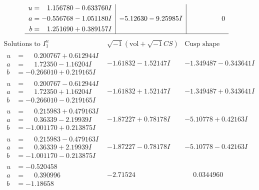 \documentclass[1p]{elsarticle_modified}
\theoremstyle{definition}
\newcommand{\I}{\sqrt{-1}}
\begin{document}
$$\begin{array}{c|c|c}
\begin{aligned}
u &= \phantom{-}1.156780 - 0.633760 I \\
a &= -0.556768 - 1.051180 I \\
b &= \phantom{-}1.251690 + 0.389157 I\end{aligned}
 & -5.12630 - 9.25985 I & \phantom{-0.000000 } 0\\
 \hline 
 \end{array}$$\newpage$$\begin{array}{c|c|c}  
\text{Solutions to }I^u_{1}& \I (\text{vol} + \sqrt{-1}CS) & \text{Cusp shape}\\
 \hline 
\begin{aligned}
u &= \phantom{-}0.200767 + 0.612944 I \\
a &= \phantom{-}1.72350 - 1.16204 I \\
b &= -0.266010 + 0.219165 I\end{aligned}
 & -1.61832 - 1.52147 I & -1.349487 - 0.343641 I \\ \hline\begin{aligned}
u &= \phantom{-}0.200767 - 0.612944 I \\
a &= \phantom{-}1.72350 + 1.16204 I \\
b &= -0.266010 - 0.219165 I\end{aligned}
 & -1.61832 + 1.52147 I & -1.349487 + 0.343641 I \\ \hline\begin{aligned}
u &= \phantom{-}0.215983 + 0.479163 I \\
a &= \phantom{-}0.36339 - 2.19939 I \\
b &= -1.001170 + 0.213875 I\end{aligned}
 & -1.87227 + 0.78178 I & -5.10778 + 0.42163 I \\ \hline\begin{aligned}
u &= \phantom{-}0.215983 - 0.479163 I \\
a &= \phantom{-}0.36339 + 2.19939 I \\
b &= -1.001170 - 0.213875 I\end{aligned}
 & -1.87227 - 0.78178 I & -5.10778 - 0.42163 I \\ \hline\begin{aligned}
u &= -0.520458\phantom{ +0.000000I} \\
a &= \phantom{-}0.390996\phantom{ +0.000000I} \\
b &= -1.18658\phantom{ +0.000000I}\end{aligned}
 & -2.71524\phantom{ +0.000000I} & \phantom{-}0.0344960\phantom{ +0.000000I} \\ \hline\begin{aligned}

\end{aligned}
\end{array}$$
\end{document}
